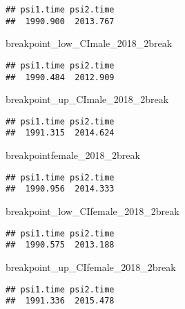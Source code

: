 \documentclass[]{article}
\newenvironment{Shaded}{\begin{snugshade}}{\end{snugshade}}
\newcommand{\NormalTok}[1]{#1}
\begin{document}
\begin{verbatim}
## psi1.time psi2.time 
##  1990.900  2013.767
\end{verbatim}

\begin{Shaded}
\begin{Highlighting}[]
\NormalTok{breakpoint_low_CImale_2018_2break}
\end{Highlighting}
\end{Shaded}

\begin{verbatim}
## psi1.time psi2.time 
##  1990.484  2012.909
\end{verbatim}

\begin{Shaded}
\begin{Highlighting}[]
\NormalTok{breakpoint_up_CImale_2018_2break}
\end{Highlighting}
\end{Shaded}

\begin{verbatim}
## psi1.time psi2.time 
##  1991.315  2014.624
\end{verbatim}

\begin{Shaded}
\begin{Highlighting}[]
\NormalTok{breakpointfemale_2018_2break}
\end{Highlighting}
\end{Shaded}

\begin{verbatim}
## psi1.time psi2.time 
##  1990.956  2014.333
\end{verbatim}

\begin{Shaded}
\begin{Highlighting}[]
\NormalTok{breakpoint_low_CIfemale_2018_2break}
\end{Highlighting}
\end{Shaded}

\begin{verbatim}
## psi1.time psi2.time 
##  1990.575  2013.188
\end{verbatim}

\begin{Shaded}
\begin{Highlighting}[]
\NormalTok{breakpoint_up_CIfemale_2018_2break}
\end{Highlighting}
\end{Shaded}

\begin{verbatim}
## psi1.time psi2.time 
##  1991.336  2015.478
\end{verbatim}
\end{document}
